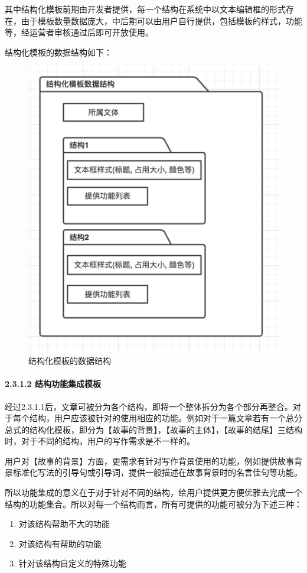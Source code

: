 \documentclass[10pt,letterpaper]{article}
\begin{document}
其中结构化模板前期由开发者提供，每一个结构在系统中以文本编辑框的形式存在，由于模板数量数据庞大，中后期可以由用户自行提供，包括模板的样式，功能等，经运营者审核通过后即可开放使用。

结构化模板的数据结构如下：

\begin{figure}[H]
	\begin{center}
		\includegraphics[width=0.5\linewidth]{___3.png}
		\caption{结构化模板的数据结构}
		\label{Fig:1}
	\end{center}
	\vspace{-0.5em}
\end{figure}

\paragraph{2.3.1.2 结构功能集成模板}

\rule{0pt}{0pt} 

经过2.3.1.1后，文章可被分为各个结构，即将一个整体拆分为各个部分再整合。对于每个结构，用户应该被针对的使用相应的功能。例如对于一篇文章若有一个总分总式的结构化模板，即分为【故事的背景】，【故事的主体】，【故事的结尾】三结构时，对于不同的结构，用户的写作需求是不一样的。

用户对【故事的背景】方面，更需求有针对写作背景使用的功能，例如提供故事背景标准化写法的引导句或引导词，提供一般描述在故事背景时的名言佳句等功能。

所以功能集成的意义在于对于针对不同的结构，给用户提供更方便优雅去完成一个结构的功能集合。所以对每一个结构而言，所有可提供的功能可被分为下述三种：

\begin{enumerate}
\item 	对该结构帮助不大的功能
\item 	对该结构有帮助的功能
\item 	针对该结构自定义的特殊功能
\end{enumerate}
\end{document}
